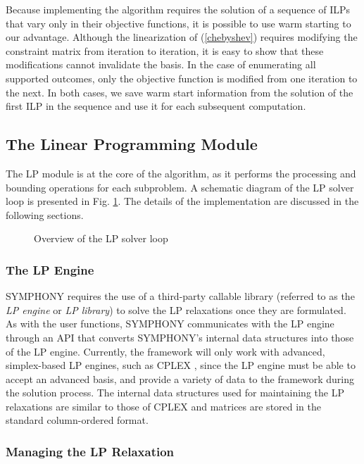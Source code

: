 Because implementing the algorithm requires the solution of a sequence of
ILPs that vary only in their objective functions, it is possible to use warm
starting to our advantage.  Although the linearization of (\ref{chebyshev})
requires modifying the constraint matrix from iteration to iteration, it is
easy to show that these modifications cannot invalidate the basis. In the case
of enumerating all supported outcomes, only the objective function is modified
from one iteration to the next. In both cases, we save warm start information
from the solution of the first ILP in the sequence and use it for each
subsequent computation.

\subsection{The Linear Programming  Module}

The LP module is at the core of the algorithm, as it performs the
processing and bounding operations for each subproblem. A schematic
diagram of the LP solver loop is presented in Fig. \ref{LP-loop}.
The details of the implementation are discussed in the following
sections. 

\begin{figure}
\centering
{}
\caption{Overview of the LP solver loop}
\label{LP-loop}
\end{figure}

\subsubsection{The LP Engine}

SYMPHONY requires the use of a third-party callable library (referred
to as the {\em LP engine} or {\em LP library}) to solve the LP
relaxations once they are formulated. As with the user functions,
SYMPHONY communicates with the LP engine through an API that converts
SYMPHONY's internal data structures into those of the LP engine.
Currently, the framework will only work with advanced, simplex-based
LP engines, such as CPLEX \cite{cplex}, since the LP engine must be
able to accept an advanced basis, and provide a variety of data to the
framework during the solution process. The internal data structures
used for maintaining the LP relaxations are similar to those of CPLEX
and matrices are stored in the standard column-ordered format.

\subsubsection{Managing the LP Relaxation}
\label{lp-relaxation}

